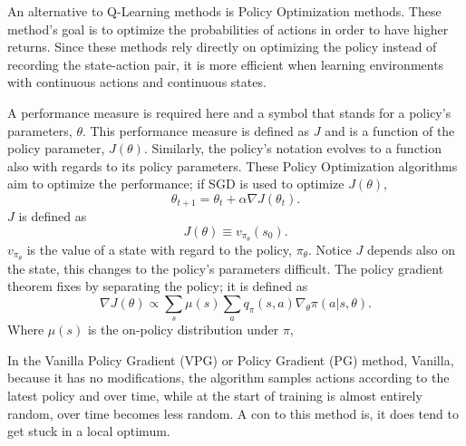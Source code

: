 An alternative to Q-Learning methods is Policy Optimization methods. These method's goal is to optimize the probabilities of actions in order to have higher returns. Since these methods rely directly on optimizing the policy instead of recording the state-action pair, it is more efficient when learning environments with continuous actions and continuous states.

A  performance measure is required here and a symbol that stands for a policy's parameters, $\theta$. This performance measure is defined as $J$ and is a function of the policy parameter, $J(\theta)$. Similarly, the policy's notation evolves to a function also with regards to its policy parameters. These Policy Optimization algorithms aim to optimize the performance; if SGD is used to optimize $J(\theta)$, $$\theta_{t+1}=\theta_t+\alpha \nabla J(\theta_t).$$ $J$ is defined as $$J(\theta)\equiv v_{\pi_{\theta}}(s_0).$$ $v_{\pi_{\theta}}$ is the value of a state with regard to the policy, $\pi_{\theta}$. Notice $J$ depends also on the state, this changes to the policy's parameters difficult. The policy gradient theorem fixes by separating the policy; it is defined as $$\nabla J(\theta)\propto \sum_s \mu(s) \sum_a q_\pi (s, a)\nabla_{\theta} \pi (a|s, \theta).$$ Where $\mu(s)$ is the on-policy distribution under $\pi$, 

In the Vanilla Policy Gradient (VPG) or Policy Gradient (PG) method, Vanilla, because it has no modifications, the algorithm samples actions according to the latest policy and over time, while at the start of training is almost entirely random, over time becomes less random. A con to this method is, it does tend to get stuck in a local optimum.

